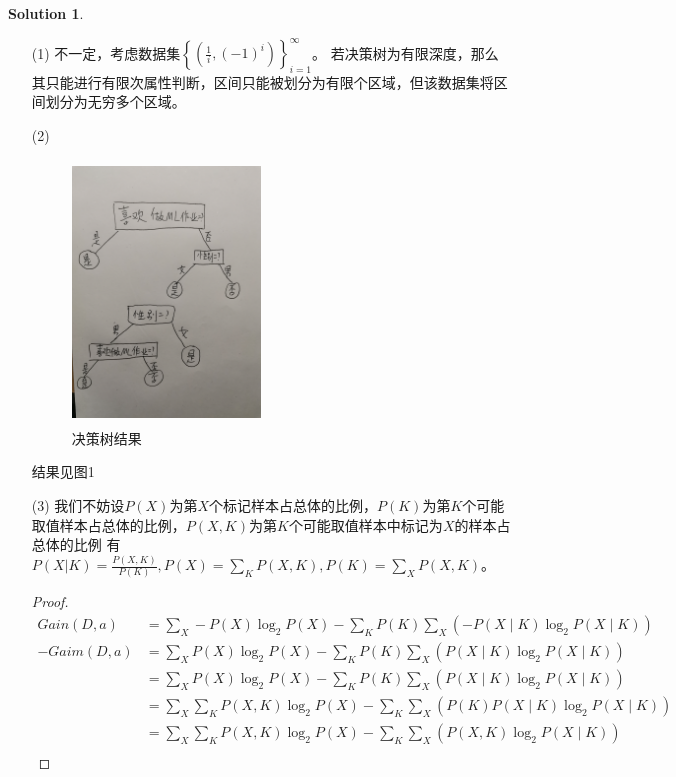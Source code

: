 \documentclass[a4paper,UTF8]{article}
\theoremstyle{definition}
\newtheorem*{solution}{Solution}
\begin{document}
\begin{solution}
	\begin{enumerate}
		\item [(1)]
		      不一定，考虑数据集$\left\{(\frac{1}{i}, (-1)^i)\right\}_{i=1}^{\infty}$。
		      若决策树为有限深度，那么其只能进行有限次属性判断，区间只能被划分为有限个区域，但该数据集将区间划分为无穷多个区域。
		\item [(2)]
		      \begin{figure}
			      \centering
			      \includegraphics[width=5cm,height=7cm]{P3-2.jpg}
			      \caption{决策树结果}
		      \end{figure}
		      结果见图1
		\item [(3)]
		      我们不妨设$P(X)$为第$X$个标记样本占总体的比例，$P(K)$为第$K$个可能取值样本占总体的比例，$P(X,K)$为第$K$个可能取值样本中标记为$X$的样本占总体的比例
		      有$P(X|K) = \frac{P(X,K)}{P(K)},P(X)=\sum_KP(X,K),P(K)=\sum_XP(X,K)$。
		      \begin{proof}
			      \begin{align*}
				      Gain(D,a)  & = \sum_{X}-P(X) \log _{2} P(X)-\sum_{K} P(K) \sum_{X}\left(-P(X \mid K) \log _{2} P(X \mid K)\right)                         \\
				      -Gaim(D,a) & = \sum_{X} P(X) \log _{2} P(X)-\sum_{K} P(K) \sum_{X}\left(P(X \mid K) \log _{2} P(X \mid K)\right)                          \\
				                 & = \sum_{X} P(X) \log _{2} P(X)-\sum_{K} P(K) \sum_{X}\left(P(X \mid K) \log _{2} P(X \mid K)\right)                          \\
				                 & = \sum_{X} \sum_{K} P(X, K) \log _{2} P(X)-\sum_{K} \sum_{X}\left(P(K) P(X \mid K) \log _{2} P(X \mid K)\right)              \\
				                 & = \sum_{X} \sum_{K} P(X, K) \log _{2} P(X)-\sum_{K} \sum_{X}\left(P(X, K) \log _{2} P(X \mid K)\right)                       \\

\end{align*}
\end{proof}
\end{enumerate}
\end{solution}
\end{document}
